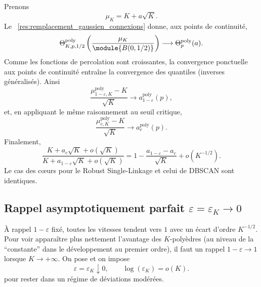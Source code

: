 \begin{Preuve}
Prenons
\[
    \mu_K=K+a\sqrt K.
\]
Le \Res~\ref{res:remplacement_gaussien_connexions} donne, aux points de continuité,
\[
    \Theta^{\mathrm{poly}}_{K,p,1/2}\left(\frac{\mu_K}{\module{B(0,1/2)}}\right)
    \longrightarrow
    \Theta_p^{\mathrm{poly}}(a).
\]
Comme les fonctions de percolation sont croissantes, la convergence ponctuelle aux points de continuité entraîne la convergence des quantiles (inverses généralisés). Ainsi
\[
    \frac{\mu_{1-\varepsilon,K}^{\mathrm{poly}}-K}{\sqrt K}
    \longrightarrow
    a_{1-\varepsilon}^{\mathrm{poly}}(p),
\]
et, en appliquant le même raisonnement au seuil critique,
\[
    \frac{\mu_{c,K}^{\mathrm{poly}}-K}{\sqrt K}
    \longrightarrow
    a_c^{\mathrm{poly}}(p).
\]
Finalement,
\[
    \frac{K+a_c\sqrt K+o(\sqrt K)}
         {K+a_{1-\varepsilon}\sqrt K+o(\sqrt K)}
    =
    1-\frac{a_{1-\varepsilon}-a_c}{\sqrt K}
    +o(K^{-1/2}).
\]
Le cas des cœurs pour le Robust Single-Linkage et celui de DBSCAN sont identiques.
\end{Preuve}


\subsection{Rappel asymptotiquement parfait $\varepsilon=\varepsilon_K\to0$}

À rappel $1-\varepsilon$ fixé, toutes les vitesses tendent vers $1$ avec un écart d'ordre $K^{-1/2}$. Pour voir apparaître plus nettement l'avantage des $K$-polyèdres (au niveau de la ``constante'' dans le développement au premier ordre), il faut un rappel $1 - \varepsilon \to 1$ lorsque $K \to +\infty$. On pose et on impose 
\[
    \varepsilon=\varepsilon_K\downarrow0,
    \qquad
    \log(\varepsilon_K)=o(K).
\]
pour rester dans un régime de déviations modérées.

